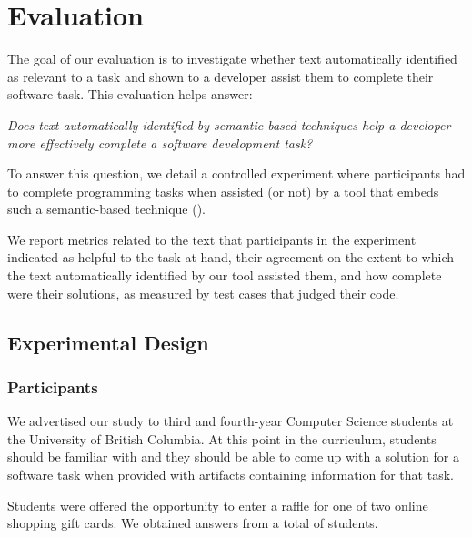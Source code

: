\clearpage

\section{Evaluation}
\label{cp6:evaluation}


The goal of our evaluation is to investigate whether text automatically identified
as relevant to a task and shown to a developer assist them to complete their software task.
This evaluation helps answer: 


\medskip
\begin{bluequote}
    \textit{ Does text automatically identified by semantic-based techniques help a 
    developer more effectively complete a software development task?} 
\end{bluequote}


To answer this question, we detail a controlled experiment where participants 
had to complete  programming tasks when assisted (or not) by a
 tool that embeds such a semantic-based technique (). 


We report metrics related to the text that participants in the experiment indicated as helpful to the task-at-hand, their agreement on the extent to which the text automatically identified by our tool 
assisted them, and how complete were their solutions, as measured by test cases that judged
their code.


\subsection{Experimental Design}


\subsubsection{Participants}



We advertised our study to third and fourth-year Computer Science students at the University of British Columbia. 
At this point in the curriculum, students should be familiar with  and they should be able to come up with a solution 
for a software task when provided with artifacts containing information for that task.


Students were offered the opportunity to enter a raffle for one of two  online shopping gift cards.
We obtained answers from a total of \red{\#} students. 


